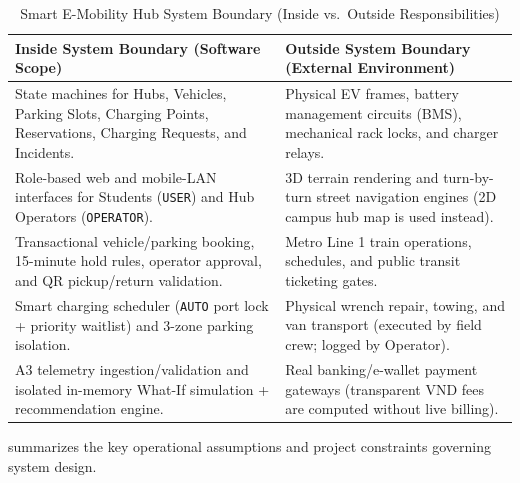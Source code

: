 \begin{table}[H]
  \centering
  \singlespacing\footnotesize
  \caption{Smart E-Mobility Hub System Boundary (Inside vs.\ Outside Responsibilities)}
  \label{tab:system-boundary}
  \renewcommand{\arraystretch}{1.28}
  \begin{tabularx}{\textwidth}{|Y|Y|}
    \hline
    \textbf{Inside System Boundary (Software Scope)} & \textbf{Outside System Boundary (External Environment)} \\
    \hline
    State machines for Hubs, Vehicles, Parking Slots, Charging Points, Reservations, Charging Requests, and Incidents. & Physical EV frames, battery management circuits (BMS), mechanical rack locks, and charger relays. \\
    \hline
    Role-based web and mobile-LAN interfaces for Students (\texttt{USER}) and Hub Operators (\texttt{OPERATOR}). & 3D terrain rendering and turn-by-turn street navigation engines (2D campus hub map is used instead). \\
    \hline
    Transactional vehicle/parking booking, 15-minute hold rules, operator approval, and QR pickup/return validation. & Metro Line 1 train operations, schedules, and public transit ticketing gates. \\
    \hline
    Smart charging scheduler (\texttt{AUTO} port lock + priority waitlist) and 3-zone parking isolation. & Physical wrench repair, towing, and van transport (executed by field crew; logged by Operator). \\
    \hline
    A3 telemetry ingestion/validation and isolated in-memory What-If simulation + recommendation engine. & Real banking/e-wallet payment gateways (transparent VND fees are computed without live billing). \\
    \hline
  \end{tabularx}
\end{table}

\label{subsec:assumptions}
 summarizes the key operational assumptions and project constraints governing system design.


